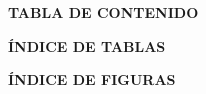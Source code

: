 \begin{center}
    \textbf{\fontsize{14}{16}\selectfont TABLA DE CONTENIDO}
\end{center}

\renewcommand{\contentsname}{}
\begin{customfontsize}
    \tableofcontents
\end{customfontsize}

\newpage

\begin{center}
    \textbf{\fontsize{14}{16}\selectfont ÍNDICE DE TABLAS}
\end{center}

\renewcommand{\listtablename}{} %

\begin{customfontsize}
    \listoftables
\end{customfontsize}

\newpage

\begin{center}
    \textbf{\fontsize{14}{16}\selectfont ÍNDICE DE FIGURAS}
\end{center}

\renewcommand{\listfigurename}{} %

\begin{customfontsize}
    \listoffigures
\end{customfontsize}
